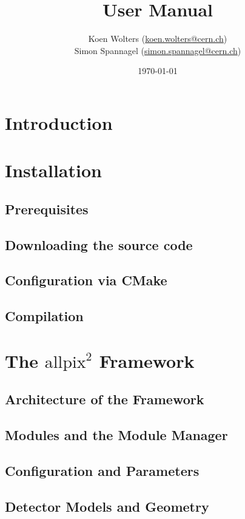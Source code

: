 \documentclass{scrartcl}
\title{\apsq User Manual} %
\author{Koen Wolters (\href{mailto:koen.wolters@cern.ch}{koen.wolters@cern.ch})\\
  Simon Spannagel (\href{mailto:simon.spannagel@cern.ch}{simon.spannagel@cern.ch})
} %
\date{\today} %
\newcommand{\apsq}{\texorpdfstring{\ensuremath{\mathrm{allpix}^2}}{allpix\textasciicircum 2}\xspace}
\begin{document}
\maketitle %


\begin{abstract}
\end{abstract}

\clearpage
\tableofcontents

\clearpage

\section{Introduction}

\section{Installation}
\subsection{Prerequisites}
\subsection{Downloading the source code}
\subsection{Configuration via CMake}
\subsection{Compilation}

\section{The \apsq Framework}
\subsection{Architecture of the Framework}
\subsection{Modules and the Module Manager}
\subsection{Configuration and Parameters}
\subsection{Detector Models and Geometry}
\end{document}
